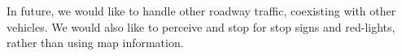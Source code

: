 \documentclass[letterpaper, 10 pt, conference]{ieeeconf}  %
\begin{document}
In future, we would like to handle other roadway traffic, 
coexisting with other vehicles. We would also like to perceive and stop for stop signs and red-lights,
rather than using map information.





\end{document}
